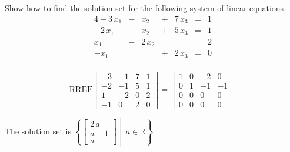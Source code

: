 
\begin{exerciseStatement}


Show how to find the solution set for the following system of linear equations. 
\begin{alignat*}{4} -3 \, x_{1} &-& x_{2} &+& 7 \, x_{3} &=& 1 \\-2 \, x_{1} &-& x_{2} &+& 5 \, x_{3} &=& 1 \\x_{1} &-& 2 \, x_{2} & &  &=& 2 \\-x_{1} & &  &+& 2 \, x_{3} &=& 0 \\ \end{alignat*}
            


\end{exerciseStatement}
    
\begin{exerciseAnswer} 
\[\mathrm{RREF} \left[\begin{array}{ccc|c}
-3 & -1 & 7 & 1 \\
-2 & -1 & 5 & 1 \\
1 & -2 & 0 & 2 \\
-1 & 0 & 2 & 0
\end{array}\right]  =  \left[\begin{array}{ccc|c}
1 & 0 & -2 & 0 \\
0 & 1 & -1 & -1 \\
0 & 0 & 0 & 0 \\
0 & 0 & 0 & 0
\end{array}\right] \]

The solution set is \( \left\{ \left[\begin{array}{c}
2 \, a \\
a - 1 \\
a
\end{array}\right] \middle|\,a\in\mathbb{R}\right\} \)


\end{exerciseAnswer}
    

